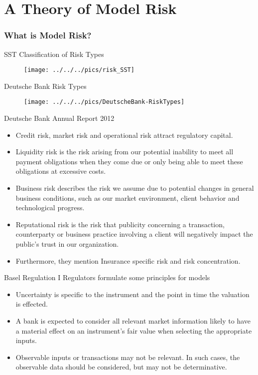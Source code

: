 
\part{A Theory of Model Risk}

\section{What is Model Risk?}

{SST Classification of Risk Types}
\begin{figure}
	\centering
		\texttt{[image: ../../../pics/risk\_SST]}
	\label{fig:Risk_map1}
\end{figure}

{Deutsche Bank Risk Types}
\begin{figure}
	\centering
		\texttt{[image: ../../../pics/DeutscheBank-RiskTypes]}
	\label{fig:Risk_map2}
\end{figure}

{Deutsche Bank Annual Report 2012}
\begin{itemize}
\item<1->
Credit risk, market risk and operational risk attract regulatory capital.
\item<2-> Liquidity risk is the risk arising from our potential inability to meet all payment obligations when they come due or only being able to meet these obligations at excessive costs.
\item<3->Business risk describes the risk we assume due to potential changes in general business conditions, such as our market environment, client behavior and technological progress.
\item<4->Reputational risk is the risk that publicity concerning a transaction, counterparty or business practice involving a client will negatively impact the public's trust in our organization.
\item<5->Furthermore, they mention Insurance specific risk and risk concentration.
\end{itemize}

{Basel Regulation I}
Regulators formulate some principles for models
\begin{itemize}
\item<1-> Uncertainty is specific to the instrument and the point in time the valuation is effected.
\item<2-> A bank is expected to consider all relevant market information likely to have a material effect on an instrument's fair value when selecting the appropriate inputs.
\item<3->Observable inputs or transactions may not be relevant. In such cases, the observable data should be considered, but   may not be determinative.
\end{itemize}

